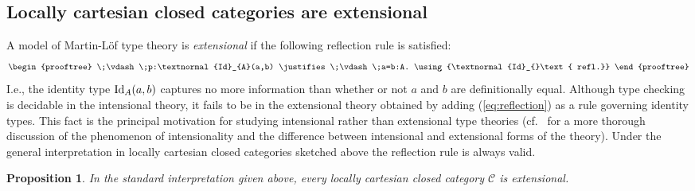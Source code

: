 \documentclass{amsart}
\newcommand{\judge}[2]{#1\;\vdash\;#2}
\newcommand{\id}[1]{\textnormal{Id}_{#1}}
\newtheorem{proposition}[theorem]{Proposition}
\theoremstyle{definition}
\theoremstyle{remark}
\begin{document}
\subsection{Locally cartesian closed categories are extensional}

A model of Martin-L\"{o}f type theory is
\emph{extensional} if the following reflection
rule is satisfied:
\begin{align}\label{eq:reflection}
  \begin{prooftree}
    \judge{}{p:\id{A}(a,b)}
    \justifies
    \judge{}{a=b:A}.
    \using{\id{}\text{ refl.}}
  \end{prooftree}
\end{align}
I.e., the identity type
$\id{A}(a,b)$ captures no more information than whether or not $a$ and
$b$ are definitionally equal.  Although type checking is decidable in
the intensional theory, it fails to be in the extensional theory
obtained by adding (\ref{eq:reflection}) as a rule governing identity types.
This fact is the principal motivation for studying intensional rather
than extensional type theories (cf.~\cite{Streicher:IIITT} for a more
thorough discussion of the phenomenon of intensionality and the
difference between intensional and extensional forms of the theory).
Under the general interpretation in
locally cartesian closed categories
sketched above the reflection rule is always valid.
\begin{proposition}
  In the standard interpretation given above, every locally cartesian
  closed category $\mathcal{C}$ is extensional. 
\end{proposition}
\end{document}

